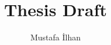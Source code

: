 \documentclass[12pt]{report}
\begin{document}
\title{Thesis Draft}
\author{Mustafa İlhan}
\maketitle
{}
\setcounter{secnumdepth}{3}
\setcounter{tocdepth}{3}
\tableofcontents



\end{document}
